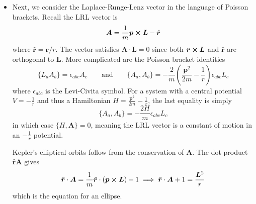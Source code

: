 \documentclass[11pt, a4paper]{article}
\newcommand{\eqtext}[1]{\qquad \text{#1} \qquad}
\begin{document}
\begin{itemize}
	\item Next, we consider the Laplace-Runge-Lenz vector in the language of Poisson brackets. Recall the LRL vector is
	\begin{equation*}
		\bm{A} = \frac{1}{m} \bm{p} \cross \bm{L} - \hat{\bm{r}}
	\end{equation*}
	where $ \hat{\bm{r}} = \bm{r}/r$. The vector satisfies $ \bm{A}\cdot \bm{L} = 0 $ since both $ \bm{r} \cross \bm{L} $ and $ \hat{\bm{r}} $ are orthogonal to $ \bm{L} $. More complicated are the Poisson bracket identities
	\begin{equation*}
		\{L_{a} A_{b} \} = \epsilon_{abc}A_{c} \eqtext{and} \{A_{a}, A_{b}\} = -\frac{2}{m} \left(\frac{\bm{p}^{2}}{2m} - \frac{1}{r}\right)\epsilon_{abc}L_{c}
	\end{equation*}
	where $ \epsilon_{abc} $ is the Levi-Civita symbol. For a system with a central potential $ V = -\frac{1}{r} $ and thus a Hamiltonian $ H = \frac{\bm{p}^{2}}{2m} - \frac{1}{r} $, the last equality is simply
	\begin{equation*}
		\{A_{a}, A_{b}\} = -\frac{2H}{m}\epsilon_{abc}L_{c}
	\end{equation*}
	in which case $ \{H, \bm{A} \} = 0 $, meaning the LRL vector is a constant of motion in an $ -\frac{1}{r} $ potential.
	
	Kepler's elliptical orbits follow from the conservation of $ \bm{A} $. The dot product $ \hat{\bm{r}}\bm{A}$ gives
	\begin{equation*}
		 \hat{\bm{r}}\cdot \bm{A} = \frac{1}{m} \hat{\bm{r}} \cdot (\bm{p} \cross \bm{L}) - 1 \implies \hat{\bm{r}}\cdot \bm{A} + 1 = \frac{\bm{L}^{2}}{r}
	\end{equation*}
	which is the equation for an ellipse.
\end{itemize}
\end{document}

